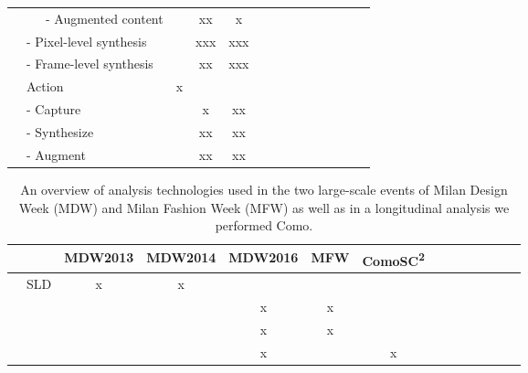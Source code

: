 \begin{table}[t]
\begin{tabular}{@{}llccccccccclcl@{}}
                          & ~~~- Augmented content   &                & \cellcolor[HTML]{EFEFEF}xx                  &  x    \\
                          & - Pixel-level synthesis &                & \cellcolor[HTML]{EFEFEF}xxx                & xxx     \\
                          & - Frame-level synthesis &                   & xx                    & \cellcolor[HTML]{EFEFEF}xxx   \\ \midrule
\parbox[t]{1mm}{}                & Action                &   x                &                    &       &   \\
                          & - Capture             &                  & x                          & xx   \\
                          & - Synthesize          &                 & xx                         & xx    \\
                          & - Augment             &                 &  xx                        & xx     \\ \bottomrule
\end{tabular}
\end{table}

\begin{table}
\centering
\caption{An overview of analysis technologies used in the two large-scale events of Milan Design Week (MDW) and Milan Fashion Week (MFW) as well as in a longitudinal analysis we performed Como.}
\label{tab:techAnalysis}
\begin{tabular}{@{}llccccccccclcl@{}}
\toprule
& & MDW2013 & MDW2014 & MDW2016 & MFW & ComoSC\textsuperscript{2} \\ \midrule
\parbox[t]{1mm}{} & SLD                     & x & x &   &   &   \\
                          & \sti{}                   &   &   & x & x &   \\
                          & \hivedi{}                &   &   & x & x &   \\
                          & \sparkdi{}               &   &   & x &   & x \\ \midrule
\end{tabular}
\end{table}

